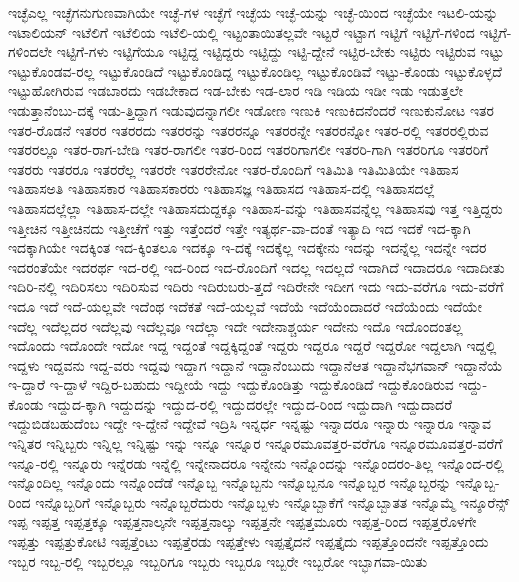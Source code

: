 {ಇಚ್ಛೆಎಲ್ಲ
ಇಚ್ಛೆಗನುಗುಣವಾಗಿಯೇ
ಇಚ್ಛೆ-ಗಳ
ಇಚ್ಛೆಗೆ
ಇಚ್ಛೆಯ
ಇಚ್ಛೆ-ಯನ್ನು
ಇಚ್ಛೆ-ಯಿಂದ
ಇಚ್ಛೆಯೇ
ಇಟಲಿ-ಯನ್ನು
ಇಟಾಲಿಯನ್
ಇಟೆಲಿಗೆ
ಇಟೆಲಿಯ
ಇಟೆಲಿ-ಯಲ್ಲಿ
ಇಟ್ಟಂತಾಯಿತಲ್ಲವೇ
ಇಟ್ಟರೆ
ಇಟ್ಟಾಗ
ಇಟ್ಟಿಗೆ
ಇಟ್ಟಿಗೆ-ಗಳಿಂದ
ಇಟ್ಟಿಗೆ-ಗಳಿಂದಲೇ
ಇಟ್ಟಿಗೆ-ಗಳು
ಇಟ್ಟಿಗೆಯೂ
ಇಟ್ಟಿದ್ದ
ಇಟ್ಟಿದ್ದರು
ಇಟ್ಟಿದ್ದು
ಇಟ್ಟಿ-ದ್ದೇನೆ
ಇಟ್ಟಿರ-ಬೇಕು
ಇಟ್ಟಿರು
ಇಟ್ಟಿರುವ
ಇಟ್ಟು
ಇಟ್ಟುಕೊಂಡವ-ರಲ್ಲ
ಇಟ್ಟುಕೊಂಡಿದೆ
ಇಟ್ಟುಕೊಂಡಿದ್ದ
ಇಟ್ಟುಕೊಂಡಿಲ್ಲ
ಇಟ್ಟುಕೊಂಡಿವೆ
ಇಟ್ಟು-ಕೊಂಡು
ಇಟ್ಟುಕೊಳ್ಳದೆ
ಇಟ್ಟುಹೋಗಿರುವ
ಇಡಬಾರದು
ಇಡಬೇಕಾದ
ಇಡ-ಬೇಕು
ಇಡ-ಲಾರ
ಇಡಿ
ಇಡಿಯ
ಇಡೀ
ಇಡು
ಇಡುತ್ತಲೇ
ಇಡುತ್ತಾನೆಂಬು-ದಕ್ಕೆ
ಇಡು-ತ್ತಿದ್ದಾಗ
ಇಡುವುದನ್ನಾಗಲೀ
ಇಡೋಣ
ಇಣುಕಿ
ಇಣುಕಿದನೆಂದರೆ
ಇಣುಕುನೋಟ
ಇತರ
ಇತರ-ರೊಡನೆ
ಇತರರ
ಇತರರದು
ಇತರರನ್ನು
ಇತರರನ್ನೂ
ಇತರರನ್ನೇ
ಇತರರನ್ನೋ
ಇತರ-ರಲ್ಲಿ
ಇತರರಲ್ಲಿರುವ
ಇತರರಲ್ಲೂ
ಇತರ-ರಾಗ-ಬೇಡಿ
ಇತರ-ರಾಗಲೀ
ಇತರ-ರಿಂದ
ಇತರರಿಗಾಗಲೀ
ಇತರರಿ-ಗಾಗಿ
ಇತರರಿಗೂ
ಇತರರಿಗೆ
ಇತರರು
ಇತರರೂ
ಇತರರೆಲ್ಲ
ಇತರರೇ
ಇತರರೇನೋ
ಇತರ-ರೊಂದಿಗೆ
ಇತಿಮಿತಿ
ಇತಿಮಿತಿಯೇ
ಇತಿಹಾಸ
ಇತಿಹಾಸಅತಿ
ಇತಿಹಾಸಕಾರ
ಇತಿಹಾಸಕಾರರು
ಇತಿಹಾಸಜ್ಞ
ಇತಿಹಾಸದ
ಇತಿಹಾಸ-ದಲ್ಲಿ
ಇತಿಹಾಸದಲ್ಲೆ
ಇತಿಹಾಸದಲ್ಲೆಲ್ಲಾ
ಇತಿಹಾಸ-ದಲ್ಲೇ
ಇತಿಹಾಸದುದ್ದಕ್ಕೂ
ಇತಿಹಾಸ-ವನ್ನು
ಇತಿಹಾಸವನ್ನೆಲ್ಲ
ಇತಿಹಾಸವು
ಇತ್ತ
ಇತ್ತಿದ್ದರು
ಇತ್ತೀಚಿನ
ಇತ್ತೀಚಿನದು
ಇತ್ತೀಚೆಗೆ
ಇತ್ತು
ಇತ್ತೆಂದರೆ
ಇತ್ತೇ
ಇತ್ಯರ್ಥ-ವಾ-ದಂತೆ
ಇತ್ಯಾದಿ
ಇದ
ಇದಕೆ
ಇದ-ಕ್ಕಾಗಿ
ಇದಕ್ಕಾಗಿಯೇ
ಇದಕ್ಕಿಂತ
ಇದ-ಕ್ಕಿಂತಲೂ
ಇದಕ್ಕೂ
ಇ-ದಕ್ಕೆ
ಇದಕ್ಕೆಲ್ಲ
ಇದಕ್ಕೇನು
ಇದನ್ನು
ಇದನ್ನೆಲ್ಲ
ಇದನ್ನೇ
ಇದರ
ಇದರಂತೆಯೇ
ಇದರರ್ಥ
ಇದ-ರಲ್ಲಿ
ಇದ-ರಿಂದ
ಇದ-ರೊಂದಿಗೆ
ಇದಲ್ಲ
ಇದಲ್ಲದೆ
ಇದಾಗಿದೆ
ಇದಾದರೂ
ಇದಾದೀತು
ಇದಿರಿ-ನಲ್ಲಿ
ಇದಿರಿಸಲು
ಇದಿರಿಸುವ
ಇದಿರು
ಇದಿರುಬರು-ತ್ತದೆ
ಇದಿರೇನೇ
ಇದೀಗ
ಇದು
ಇದು-ವರೆಗೂ
ಇದು-ವರೆಗೆ
ಇದೂ
ಇದೆ
ಇದೆ-ಯಲ್ಲವೇ
ಇದೆಂಥ
ಇದೆಕತೆ
ಇದೆ-ಯಲ್ಲವೆ
ಇದೆಯೆ
ಇದೆಯೆಂದಾದರೆ
ಇದೆಯೆಂದು
ಇದೆಯೇ
ಇದೆಲ್ಲ
ಇದೆಲ್ಲದರ
ಇದೆಲ್ಲವು
ಇದೆಲ್ಲವೂ
ಇದೆಲ್ಲಾ
ಇದೇ
ಇದೇನಾಶ್ಚರ್ಯ
ಇದೇನು
ಇದೊ
ಇದೊಂದಂತಲ್ಲ
ಇದೊಂದು
ಇದೊಂದೇ
ಇದೋ
ಇದ್ದ
ಇದ್ದಂತೆ
ಇದ್ದಕ್ಕಿದ್ದಂತೆ
ಇದ್ದರು
ಇದ್ದರೂ
ಇದ್ದರೆ
ಇದ್ದರೋ
ಇದ್ದಲಾಗಿ
ಇದ್ದಲ್ಲಿ
ಇದ್ದಳು
ಇದ್ದವನು
ಇದ್ದ-ವರು
ಇದ್ದವು
ಇದ್ದಾಗ
ಇದ್ದಾನೆ
ಇದ್ದಾನೆಂಬುದು
ಇದ್ದಾನೆಆತ
ಇದ್ದಾನೆಭಗವಾನ್
ಇದ್ದಾನೆಯೆ
ಇ-ದ್ದಾರೆ
ಇ-ದ್ದಾಳೆ
ಇದ್ದಿರ-ಬಹುದು
ಇದ್ದೀಯೆ
ಇದ್ದು
ಇದ್ದುಕೊಂಡಿತ್ತು
ಇದ್ದುಕೊಂಡಿದೆ
ಇದ್ದುಕೊಂಡಿರುವ
ಇದ್ದು-ಕೊಂಡು
ಇದ್ದುದ-ಕ್ಕಾಗಿ
ಇದ್ದುದನ್ನು
ಇದ್ದುದ-ರಲ್ಲಿ
ಇದ್ದುದರಲ್ಲೇ
ಇದ್ದುದ-ರಿಂದ
ಇದ್ದುದಾಗಿ
ಇದ್ದುದಾದರೆ
ಇದ್ದುಬಿಡಬಹುದೆಂಬ
ಇದ್ದೇ
ಇ-ದ್ದೇನೆ
ಇದ್ದೇವೆ
ಇದ್ರಿಸಿ
ಇನ್ನರ್ಧ
ಇನ್ನಷ್ಟು
ಇನ್ನಾದರೂ
ಇನ್ನಾರು
ಇನ್ನಾರೂ
ಇನ್ನಾವ
ಇನ್ನಿತರ
ಇನ್ನಿಬ್ಬರು
ಇನ್ನಿಲ್ಲ
ಇನ್ನಿಷ್ಟು
ಇನ್ನು
ಇನ್ನೂ
ಇನ್ನೂರ
ಇನ್ನೂರಮೂವತ್ತರ-ವರೆಗೂ
ಇನ್ನೂರಮೂವತ್ತರ-ವರೆಗೆ
ಇನ್ನೂ-ರಲ್ಲಿ
ಇನ್ನೂರು
ಇನ್ನೆರಡು
ಇನ್ನೆಲ್ಲಿ
ಇನ್ನೇನಾದರೂ
ಇನ್ನೇನು
ಇನ್ನೊಂದನ್ನು
ಇನ್ನೊಂದರಂ-ತಿಲ್ಲ
ಇನ್ನೊಂದ-ರಲ್ಲಿ
ಇನ್ನೊಂದಿಲ್ಲ
ಇನ್ನೊಂದು
ಇನ್ನೊಂದೆಡೆ
ಇನ್ನೊಬ್ಬ
ಇನ್ನೊಬ್ಬನು
ಇನ್ನೊಬ್ಬನೂ
ಇನ್ನೊಬ್ಬರ
ಇನ್ನೊಬ್ಬರನ್ನು
ಇನ್ನೊಬ್ಬ-ರಿಂದ
ಇನ್ನೊಬ್ಬರಿಗೆ
ಇನ್ನೊಬ್ಬರು
ಇನ್ನೊಬ್ಬರೆದುರು
ಇನ್ನೊಬ್ಬಳು
ಇನ್ನೊಬ್ಬಾಕೆಗೆ
ಇನ್ನೊಬ್ಬಾತತ
ಇನ್ನೊಮ್ಮೆ
ಇನ್ಶೂರೆನ್ಸ್
ಇಪ್ಪ
ಇಪ್ಪತ್ತ
ಇಪ್ಪತ್ತಕ್ಕೂ
ಇಪ್ಪತ್ತನಾಲ್ಕನೇ
ಇಪ್ಪತ್ತನಾಲ್ಕು
ಇಪ್ಪತ್ತನೇ
ಇಪ್ಪತ್ತಮೂರು
ಇಪ್ಪತ್ತ-ರಿಂದ
ಇಪ್ಪತ್ತರೊಳಗೇ
ಇಪ್ಪತ್ತು
ಇಪ್ಪತ್ತುಕೋಟಿ
ಇಪ್ಪತ್ತೆಂಟು
ಇಪ್ಪತ್ತೆರಡು
ಇಪ್ಪತ್ತೇಳು
ಇಪ್ಪತ್ತೈದನೆ
ಇಪ್ಪತ್ತೈದು
ಇಪ್ಪತ್ತೊಂದನೇ
ಇಪ್ಪತ್ತೊಂದು
ಇಬ್ಬರ
ಇಬ್ಬ-ರಲ್ಲಿ
ಇಬ್ಬರಲ್ಲೂ
ಇಬ್ಬರಿಗೂ
ಇಬ್ಬರು
ಇಬ್ಬರೂ
ಇಬ್ಬರೇ
ಇಬ್ಬರೋ
ಇಬ್ಭಾಗವಾ-ಯಿತು
}
